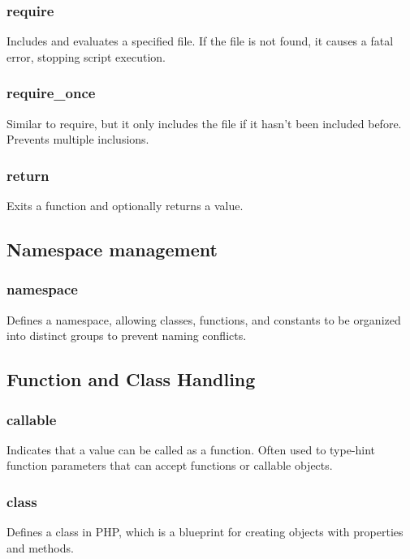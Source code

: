\documentclass{report}
\begin{document}
    \bigbreak \noindent 
    \subsubsection{require}
    \bigbreak \noindent 
    Includes and evaluates a specified file. If the file is not found, it causes a fatal error, stopping script execution.

    \bigbreak \noindent 
    \subsubsection{require\_once}
    \bigbreak \noindent 
    Similar to require, but it only includes the file if it hasn’t been included before. Prevents multiple inclusions.

    \bigbreak \noindent 
    \subsubsection{return}
    \bigbreak \noindent 
    Exits a function and optionally returns a value.

    \pagebreak 
    \subsection{Namespace management}
    \bigbreak \noindent 
    \subsubsection{namespace}
    \bigbreak \noindent 
    Defines a namespace, allowing classes, functions, and constants to be organized into distinct groups to prevent naming conflicts.


    \pagebreak
\subsection{Function and Class Handling}
\bigbreak \noindent 
\subsubsection{callable}
\bigbreak \noindent 
Indicates that a value can be called as a function. Often used to type-hint function parameters that can accept functions or callable objects.

\bigbreak \noindent 
\subsubsection{class}
\bigbreak \noindent 
Defines a class in PHP, which is a blueprint for creating objects with properties and methods.
\end{document}
